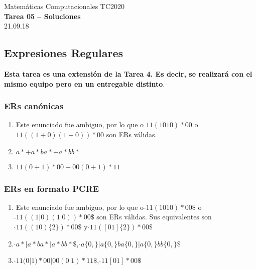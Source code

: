 \documentclass[]{book}
\theoremstyle{definition}
\begin{document}
\begin{center}
{\huge Matemáticas Computacionales TC2020}\\[1.5ex]
{\large \textbf{Tarea 05 -- Soluciones}\\[1.5ex] %
21.09.18} %
\end{center}

\vspace{0.2 cm}

\subsection*{Expresiones Regulares}

\textbf{Esta tarea es una extensión de la Tarea 4. Es decir, se realizará con el mismo equipo pero en un entregable distinto}.
\vspace{2ex}

\subsubsection*{ERs canónicas}

\begin{enumerate}
    \item Este enunciado fue ambiguo, por lo que o $11(1010)*00$ o $11((1+0)(1+0))*00$ son ERs válidas.
    \item $a* + a*ba* + a*bb*$
    \item $11(0+1)*00 + 00(0+1)*11$
\end{enumerate}
\subsubsection*{ERs en formato PCRE}

\begin{enumerate}
    \item Este enunciado fue ambiguo, por lo que o $\hat{}11(1010)*00\$$ o $\hat{}11((1|0)(1|0))*00\$$ son ERs válidas. Sus equivalentes son $\hat{}11((10)\{2\})*00\$$ y $\hat{}11([01]\{2\})*00\$$
    \item $\hat{}a* | a*ba* | a*bb*\$$, $\hat{}a\{0,\} | a\{0,\}ba\{0,\} | a\{0,\}bb\{0,\}\$$
    \item $\hat{}11(0|1)*00 | 00(0|1)*11\$$, $\hat{}11[01]*00\$$
\end{enumerate}
\end{document}
